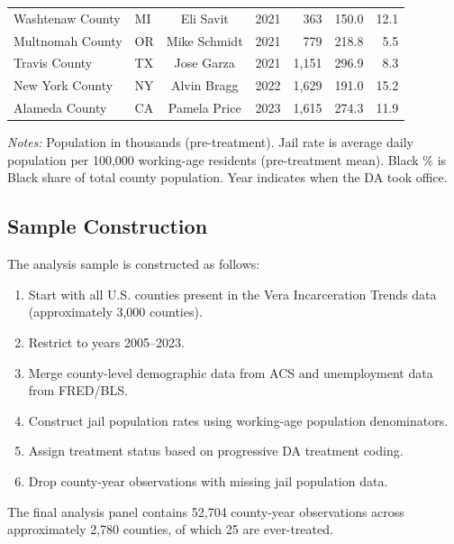 \documentclass[12pt]{article}
\begin{document}
\begin{table}[H]
\begin{threeparttable}
\begin{tabular}{llclrrr}
Washtenaw County & MI & Eli Savit & 2021 & 363 & 150.0 & 12.1 \\
Multnomah County & OR & Mike Schmidt & 2021 & 779 & 218.8 & 5.5 \\
Travis County & TX & Jose Garza & 2021 & 1,151 & 296.9 & 8.3 \\
New York County & NY & Alvin Bragg & 2022 & 1,629 & 191.0 & 15.2 \\
Alameda County & CA & Pamela Price & 2023 & 1,615 & 274.3 & 11.9 \\
\bottomrule
\end{tabular}
\begin{tablenotes}[flushleft]
\small
\item \textit{Notes:} Population in thousands (pre-treatment). Jail rate is average daily population per 100,000 working-age residents (pre-treatment mean). Black \% is Black share of total county population. Year indicates when the DA took office.
\end{tablenotes}
\end{threeparttable}
\end{table}

\subsection{Sample Construction}

The analysis sample is constructed as follows:
\begin{enumerate}
\item Start with all U.S. counties present in the Vera Incarceration Trends data (approximately 3,000 counties).
\item Restrict to years 2005--2023.
\item Merge county-level demographic data from ACS and unemployment data from FRED/BLS.
\item Construct jail population rates using working-age population denominators.
\item Assign treatment status based on progressive DA treatment coding.
\item Drop county-year observations with missing jail population data.
\end{enumerate}

The final analysis panel contains 52,704 county-year observations across approximately 2,780 counties, of which 25 are ever-treated.
\end{document}
